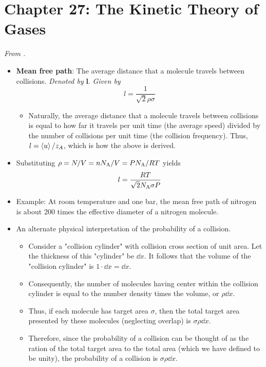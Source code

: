 \documentclass[../notes.tex]{subfiles}
\begin{document}
\section{Chapter 27: The Kinetic Theory of Gases}
\emph{From \textcite{bib:McQuarrieSimon}.}
\begin{itemize}
    \item {}\textbf{Mean free path}: The average distance that a molecule travels between collisions. \emph{Denoted by} $\bm{l}$. \emph{Given by}
    \begin{equation*}
        l = \frac{1}{\sqrt{2}\rho\sigma}
    \end{equation*}
    \begin{itemize}
        \item Naturally, the average distance that a molecule travels between collisions is equal to how far it travels per unit time (the average speed) divided by the number of collisions per unit time (the collision frequency). Thus, $l=\left\langle{u}\right\rangle/z_A$, which is how the above is derived.
    \end{itemize}
    \item Substituting $\rho=N/V=nN_\text{A}/V=PN_\text{A}/RT$ yields
    \begin{equation*}
        l = \frac{RT}{\sqrt{2}N_\text{A}\sigma P}
    \end{equation*}
    \item Example: At room temperature and one bar, the mean free path of nitrogen is about 200 times the effective diameter of a nitrogen molecule.
    \item An alternate physical interpretation of the probability of a collision.
    \begin{itemize}
        \item Consider a "collision cylinder" with collision cross section of unit area. Let the thickness of this "cylinder" be $\dd{x}$. It follows that the volume of the "collision cylinder" is $1\cdot\dd{x}=\dd{x}$.
        \item Consequently, the number of molecules having center within the collision cylinder is equal to the number density times the volume, or $\rho\dd{x}$.
        \item Thus, if each molecule has target area $\sigma$, then the total target area presented by these molecules (neglecting overlap) is $\sigma\rho\dd{x}$.
        \item Therefore, since the probability of a collision can be thought of as the ration of the total target area to the total area (which we have defined to be unity), the probability of a collision is $\sigma\rho\dd{x}$.

\end{itemize}
\end{itemize}
\end{document}
